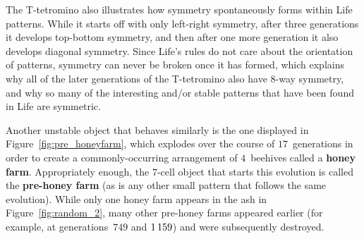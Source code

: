The T-tetromino also illustrates how symmetry spontaneously forms within Life patterns. While it starts off with only left-right symmetry, after three generations it develops top-bottom symmetry, and then after one more generation it also develops diagonal symmetry. Since Life's rules do not care about the orientation of patterns, symmetry can never be broken once it has formed, which explains why all of the later generations of the T-tetromino also have $8$-way symmetry, and why so many of the interesting and/or stable patterns that have been found in Life are symmetric.

Another unstable object that behaves similarly is the one displayed in Figure~\ref{fig:pre_honeyfarm}, which explodes over the course of $17$~generations in order to create a commonly-occurring arrangement of $4$~beehives called a \textbf{honey farm}. Appropriately enough, the $7$-cell object that starts this evolution is called the \textbf{pre-honey farm} (as is any other small pattern that follows the same evolution). While only one honey farm appears in the ash in Figure~\ref{fig:random_2}, many other pre-honey farms appeared earlier (for example, at generations~$749$ and $1{\,}159$) and were subsequently destroyed.

